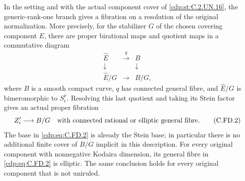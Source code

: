 
\begin{proposition}\label{cdp:st:C.2.UN.20}
In the setting and with the actual component cover of \ref{cdp:st:C.2.UN.16},
the generic-rank-one branch gives a fibration on a resolution of
the original normalization. More precisely, for the stabilizer
$G$ of the chosen covering component $E$, there are proper
birational maps and quotient maps in a commutative diagram
\[
\begin{array}{ccc}
 \widehat E&\xrightarrow{\ q\ }&B\\
 \downarrow&&\downarrow\\
 \widehat E/G&\longrightarrow&B/G,
\end{array}                                                    \tag{C.FD.1}\label{cdp:eq:C.FD.1}
\]
where $B$ is a smooth compact curve, $q$ has connected general
fibre, and $\widehat E/G$ is bimeromorphic to $S_i^\nu$.
Resolving this last quotient and taking its Stein factor gives
an actual proper fibration
\[
        Z'_i\longrightarrow B/G
        \quad\hbox{with connected rational or elliptic general fibre}.
                                                               \tag{C.FD.2}\label{cdp:eq:C.FD.2}
\]
The base in \eqref{cdp:eq:C.FD.2} is already the Stein base; in particular
there is no additional finite cover of $B/G$ implicit in this
description. For every original component with nonnegative
Kodaira dimension, its general fibre in \eqref{cdp:eq:C.FD.2} is elliptic.
The same conclusion holds for every original component that
is not uniruled.
\end{proposition}
